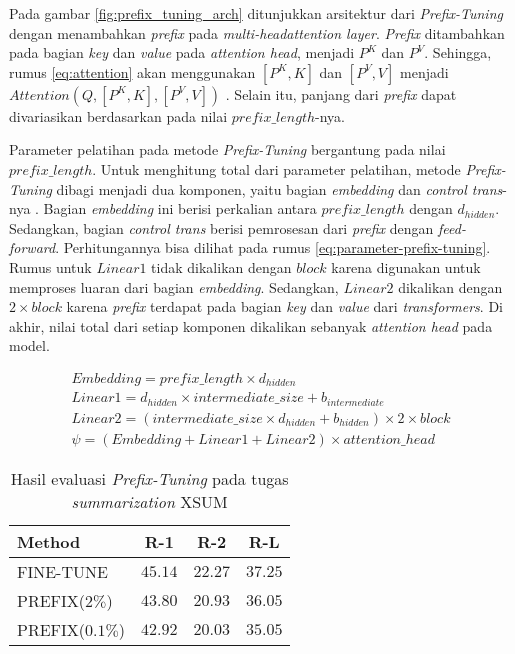 Pada gambar \ref{fig:prefix_tuning_arch} ditunjukkan arsitektur dari \textit{Prefix-Tuning} dengan menambahkan \textit{prefix} pada \textit{multi-headattention layer}. \textit{Prefix} ditambahkan pada bagian \textit{key} dan \textit{value} pada \textit{attention head}, menjadi $P^K$ dan $P^V$. Sehingga, rumus \ref{eq:attention} akan menggunakan $[P^K, K]$ dan $[P^V, V]$ menjadi $Attention(Q, [P^K, K], [P^V, V])$ \parencite{adapterhub}. Selain itu, panjang dari \textit{prefix} dapat divariasikan berdasarkan pada nilai $prefix\_length$-nya. 

Parameter pelatihan pada metode \textit{Prefix-Tuning} bergantung pada nilai $prefix\_length$. Untuk menghitung total dari parameter pelatihan, metode \textit{Prefix-Tuning} dibagi menjadi dua komponen, yaitu bagian \textit{embedding} dan \textit{control trans}-nya \parencite{adapters}. Bagian \textit{embedding} ini berisi perkalian antara $prefix\_length$ dengan $d_{hidden}$. Sedangkan, bagian \textit{control trans} berisi pemrosesan dari \textit{prefix} dengan \textit{feed-forward}. Perhitungannya bisa dilihat pada rumus \ref{eq:parameter-prefix-tuning}. Rumus untuk $Linear1$ tidak dikalikan dengan $block$ karena digunakan untuk memproses luaran dari bagian \textit{embedding}. Sedangkan, $Linear2$ dikalikan dengan $2\times{block}$ karena \textit{prefix} terdapat pada bagian \textit{key} dan \textit{value} dari \textit{transformers}. Di akhir, nilai total dari setiap komponen dikalikan sebanyak \textit{attention head} pada model.

\begin{equation}
    \begin{aligned}
        Embedding = prefix\_length \times d_{hidden} \\
        Linear1 = d_{hidden} \times intermediate\_size + b_{intermediate} \\
        Linear2 = (intermediate\_size \times d_{hidden} + b_{hidden}) \times 2 \times block \\
        \psi = (Embedding + Linear1 + Linear2) \times attention\_head
    \end{aligned}
    \label{eq:parameter-prefix-tuning}
\end{equation}

\begin{table}[h]
    \vspace{0.25cm}
    \centering
    \caption{Hasil evaluasi \textit{Prefix-Tuning} pada tugas \textit{summarization} XSUM \parencite{prefix_tuning}}
    \label{table:prefix_tuning_result}
    \begin{tabular}{lccc}
        \toprule
        Method & R-1 & R-2 & R-L \\
        \midrule
        FINE-TUNE & $45.14$ & $22.27$ & $37.25$ \\
        PREFIX($2\%$) & $43.80$ & $20.93$ & $36.05$ \\
        PREFIX($0.1\%$) & $42.92$ & $20.03$ & $35.05$ \\
        \bottomrule
    \end{tabular}
\end{table}

